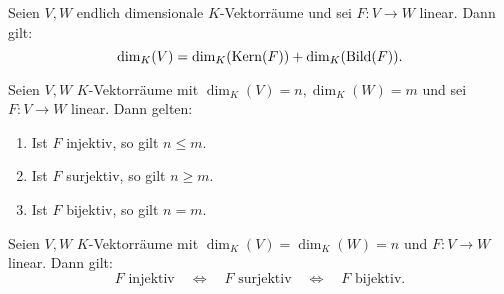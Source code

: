 \setcounter{satz}{14}
\begin{satz}
	\label{satz:I.10.15}
	Seien $V,W$ endlich dimensionale $K$-Vektorräume und sei $F \colon V \rightarrow W$ linear. 
	Dann gilt:
	\[
		\dim_K(V) = \dim_K(\operatorname{Kern}(F)) + \dim_K(\operatorname{Bild}(F)).
	\]
\end{satz}

\begin{korollar}
	\label{kor:I.10.16}
	Seien $V,W$ $K$-Vektorräume mit $\dim_K(V) = n, \dim_K(W) = m$ und sei $F\colon V \rightarrow W$ linear.
	Dann gelten:
	\begin{enumerate}[(1)]
		\item Ist $F$ injektiv, so gilt $n \leq m$.
		\item Ist $F$ surjektiv, so gilt $n \geq m$.
		\item Ist $F$ bijektiv, so gilt $n = m$.
	\end{enumerate}
\end{korollar}

\begin{korollar}
	\label{kor:I.10.17}
	Seien $V,W$ $K$-Vektorräume mit $\dim_K(V) = \dim_K(W) = n$ und $F \colon V \rightarrow W$ linear.
	Dann gilt:
	\[
		F \text{ injektiv} \quad \Leftrightarrow \quad F \text{ surjektiv} \quad \Leftrightarrow \quad F \text{ bijektiv}.
	\]
\end{korollar}
	